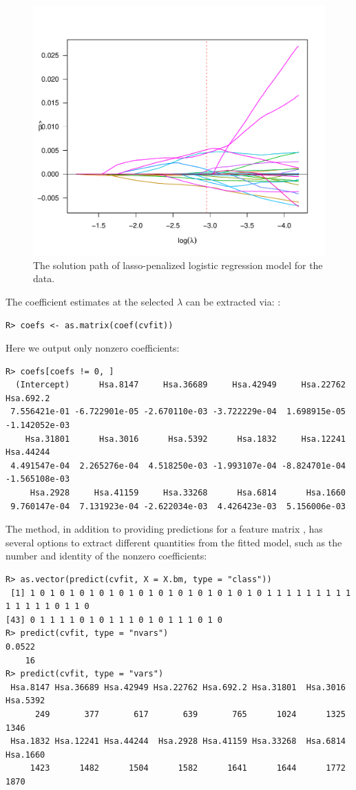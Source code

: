 \begin{figure}[ht]
\centering
\includegraphics[scale=0.4]{Figures/JSS_data_example.pdf}
\caption{The solution path of lasso-penalized logistic regression model for the  data.}
\label{data_example}
\end{figure}

The coefficient estimates at the selected $\lambda$ can be extracted via:
:
\begin{verbatim}
R> coefs <- as.matrix(coef(cvfit))
\end{verbatim}
Here we output only nonzero coefficients:
\begin{verbatim}
R> coefs[coefs != 0, ]
  (Intercept)      Hsa.8147     Hsa.36689     Hsa.42949     Hsa.22762     Hsa.692.2 
 7.556421e-01 -6.722901e-05 -2.670110e-03 -3.722229e-04  1.698915e-05 -1.142052e-03 
    Hsa.31801      Hsa.3016      Hsa.5392      Hsa.1832     Hsa.12241     Hsa.44244 
 4.491547e-04  2.265276e-04  4.518250e-03 -1.993107e-04 -8.824701e-04 -1.565108e-03 
     Hsa.2928     Hsa.41159     Hsa.33268      Hsa.6814      Hsa.1660 
 9.760147e-04  7.131923e-04 -2.622034e-03  4.426423e-03  5.156006e-03 
\end{verbatim}

The  method, in addition to providing predictions for a feature matrix , has several options to extract different quantities from the fitted model, such as the number and identity of the nonzero coefficients:
\begin{verbatim}
R> as.vector(predict(cvfit, X = X.bm, type = "class"))
 [1] 1 0 1 0 1 0 1 0 1 0 1 0 1 0 1 0 1 0 1 0 1 0 1 0 1 1 1 1 1 1 1 1 1 1 1 1 1 1 0 1 1 0
[43] 0 1 1 1 1 0 1 0 1 1 1 0 1 0 1 1 1 0 1 0
R> predict(cvfit, type = "nvars")
0.0522 
    16 
R> predict(cvfit, type = "vars")
 Hsa.8147 Hsa.36689 Hsa.42949 Hsa.22762 Hsa.692.2 Hsa.31801  Hsa.3016  Hsa.5392 
      249       377       617       639       765      1024      1325      1346 
 Hsa.1832 Hsa.12241 Hsa.44244  Hsa.2928 Hsa.41159 Hsa.33268  Hsa.6814  Hsa.1660 
     1423      1482      1504      1582      1641      1644      1772      1870 
\end{verbatim}

